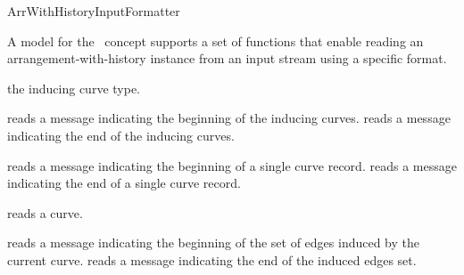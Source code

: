 
\ccRefPageBegin

\begin{ccRefConcept}{ArrWithHistoryInputFormatter}

A model for the \ccRefName\ concept supports a set of functions that enable
reading an arrangement-with-history instance from an input stream using a
specific format.

\ccRefines
{}

\ccTypes


    {the inducing curve type.}




    {reads a message indicating the beginning of the inducing curves.}
\ccGlue
{}
    {reads a message indicating the end of the inducing curves.}

    {reads a message indicating the beginning of a single curve record.}
\ccGlue
{}
    {reads a message indicating the end of a single curve record.}

    {reads a curve.}

    {reads a message indicating the beginning of the set of edges
     induced by the current curve.}
\ccGlue
{}
    {reads a message indicating the end of the induced edges set.}

\ccHasModels


\end{ccRefConcept}

\ccRefPageEnd

